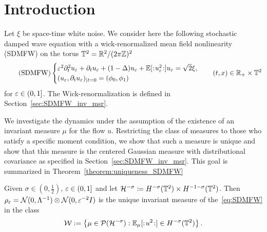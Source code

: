 \section{Introduction}

Let $\xi$ be space-time white noise. We consider here the following stochastic damped wave equation with a wick-renormalized mean field nonlinearity (SDMFW) on the torus $\mathbb{T}^2 = \mathbb{R}^2 / (2\pi \mathbb{Z})^2$ 
\begin{align}\tag{SDMFW}\label{eq:SDMFW}
\begin{cases}
\varepsilon^2 \partial_t^2 u_\varepsilon +  \partial_t u_\varepsilon + (1 - \Delta) u_\varepsilon + \mathbb{E}[:\! u_\varepsilon^2 \!:]u_\varepsilon   = \sqrt{2}\xi,    \\
(u_\varepsilon,\partial_t u_\varepsilon)_{| t=0} =(\phi _0,\phi _1) 
\end{cases}
\quad (t,x ) \in \mathbb{R}_+ \times \mathbb{T}^2
\end{align}
for $\varepsilon \in (0,1]$. The Wick-renormalization is defined in Section~\ref{sec:SDMFW_inv_msr}.

We investigate the dynamics under the assumption of the existence of an invariant measure $\mu$ for the flow $u$. Restricting the class of measures to those who satisfy a specific moment condition, we show that such a measure is unique and show that this measure is the centered Gaussian measure with distributional covariance as specified in Section~\ref{sec:SDMFW_inv_msr}. This goal is summarized in Theorem~\ref{theorem:uniqueness_SDMFW}
\begin{theorem}\label{theorem:uniqueness_SDMFW}
    Given $\sigma \in (0,\frac{1}{2})$, $\varepsilon \in (0,1]$ and let $\mathcal{H}^{-\sigma} \coloneq H^{-\sigma}(\mathbb{T}^2) \times H^{-1-\sigma}(\mathbb{T}^2)$. 
    Then $\rho_\varepsilon = \mathcal{N}(0, \Lambda^{-1}) \otimes \mathcal{N}(0, \varepsilon^{-2}I)$ is the unique invariant measure of the~\eqref{eq:SDMFW} in the class
    \[
        \mathcal W
        :=\left\{
            \mu\in\mathcal P(\mathcal H^{-\sigma}):
            \mathbb E_\mu[:\! u^2 \!:]\in H^{-\sigma}(\mathbb{T}^2)
        \right\}.
    \]
\end{theorem}

